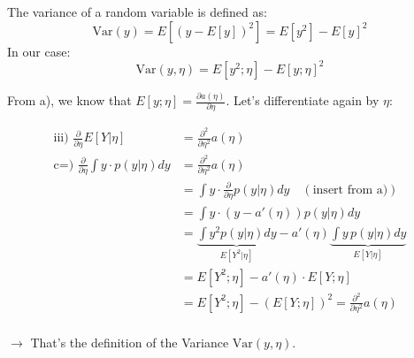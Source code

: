 \begin{answer}
    
The variance of a random variable is defined as:
\[ \text{Var}(y) = E[(y - E[y])^2] = E[y^2] - E[y]^2 \]
In our case:
\[ \text{Var}(y, \eta) = E[y^2;\eta] - E[y;\eta]^2 \]

From a), we know that $E[y; \eta] = \frac{\partial a(\eta)}{\partial \eta}$. Let's differentiate again by $\eta$:

\begin{align*}
\text{iii) } \frac{\partial}{\partial \eta} E[Y|\eta] &= \frac{\partial^2}{\partial \eta^2} a(\eta) \\
\text{c=) } \frac{\partial}{\partial \eta} \int y \cdot p(y|\eta) dy &= \frac{\partial^2}{\partial \eta^2} a(\eta) \\
&= \int y \cdot \frac{\partial}{\partial \eta} p(y|\eta) dy \quad (\text{insert from a)}) \\
&= \int y \cdot (y - a'(\eta)) p(y|\eta) dy \\
&= \underbrace{\int y^2 p(y|\eta) dy}_{E[Y^2|\eta]} - a'(\eta) \underbrace{\int y\, p(y|\eta) dy}_{E[Y|\eta]} \\
&= E[Y^2;\eta] - a'(\eta) \cdot E[Y;\eta] \\
&= E[Y^2;\eta] - (E[Y;\eta])^2 = \frac{\partial^2}{\partial \eta^2} a(\eta) \\
\end{align*}

$\rightarrow$ That's the definition of the Variance $\text{Var}(y, \eta)$. \\
\end{answer}
